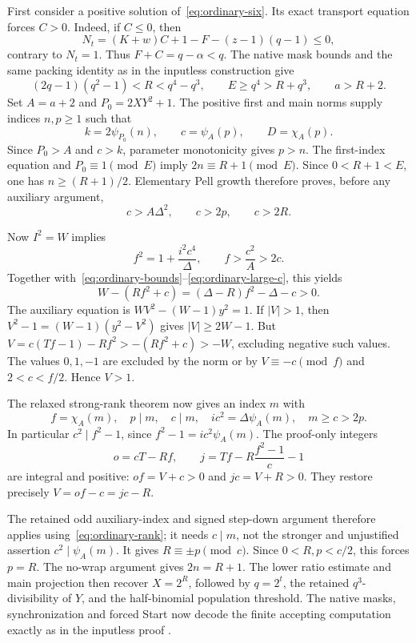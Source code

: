 First consider a positive solution of~\eqref{eq:ordinary-six}. Its exact
transport equation forces \(C>0\). Indeed, if \(C\le0\), then
\[
 N_t=(K+w)C+1-F-(z-1)(q-1)\le0,
\]
contrary to \(N_t=1\). Thus \(F+C=q-\alpha<q\). The native mask bounds
and the same packing identity as in the inputless construction give
\begin{equation}\label{eq:ordinary-bounds}
 (2q-1)(q^2-1)<R<q^4-q^3,\qquad
 E\ge q^4>R+q^3,\qquad a>R+2.
\end{equation}
Set \(A=a+2\) and \(P_0=2XY^2+1\). The positive first and main norms
supply indices \(n,p\ge1\) such that
\[
 k=2\psi_{P_0}(n),\qquad c=\psi_A(p),\qquad D=\chi_A(p).
\]
Since \(P_0>A\) and \(c>k\), parameter monotonicity gives \(p>n\).
The first-index equation and \(P_0\equiv1\pmod E\) imply
\(2n\equiv R+1\pmod E\). Since \(0<R+1<E\), one has
\(n\ge(R+1)/2\). Elementary Pell growth therefore proves, before any
auxiliary argument,
\begin{equation}\label{eq:ordinary-large-c}
 c>A\Delta^2,\qquad c>2p,\qquad c>2R.
\end{equation}

Now \(I^2=W\) implies
\[
 f^2=1+\frac{i^2c^4}{\Delta},\qquad
 f>\frac{c^2}{A}>2c.
\]
Together with~\eqref{eq:ordinary-bounds}--\eqref{eq:ordinary-large-c},
this yields
\begin{equation}\label{eq:ordinary-gap}
 W-(Rf^2+c)=(\Delta-R)f^2-\Delta-c>0.
\end{equation}
The auxiliary equation is \(WV^2-(W-1)y^2=1\). If \(|V|>1\), then
\(V^2-1=(W-1)(y^2-V^2)\) gives \(|V|\ge2W-1\). But
\(V=c(Tf-1)-Rf^2>-(Rf^2+c)>-W\), excluding negative such values.
The values \(0,1,-1\) are excluded by the norm or by
\(V\equiv-c\pmod f\) and \(2<c<f/2\). Hence \(V>1\).

The relaxed strong-rank theorem now gives an index \(m\) with
\begin{equation}\label{eq:ordinary-rank}
 f=\chi_A(m),\quad p\mid m,\quad c\mid m,\quad
 ic^2=\Delta\psi_A(m),\quad m\ge c>2p.
\end{equation}
In particular \(c^2\mid f^2-1\), since
\(f^2-1=ic^2\psi_A(m)\). The proof-only integers
\[
 o=cT-Rf,\qquad j=Tf-R\frac{f^2-1}{c}-1
\]
are integral and positive: \(of=V+c>0\) and \(jc=V+R>0\).
They restore precisely \(V=of-c=jc-R\).

The retained odd auxiliary-index and signed step-down argument therefore
applies using~\eqref{eq:ordinary-rank}; it needs \(c\mid m\), not the
stronger and unjustified assertion \(c^2\mid\psi_A(m)\). It gives
\(R\equiv\pm p\pmod c\). Since \(0<R,p<c/2\), this forces \(p=R\).
The no-wrap argument gives \(2n=R+1\). The lower ratio estimate and main
projection then recover \(X=2^R\), followed by \(q=2^t\), the retained
\(q^3\)-divisibility of \(Y\), and the half-binomial population
threshold. The native masks, synchronization and forced Start now decode
the finite accepting computation exactly as in the inputless proof
\cite{src06,src08}.

